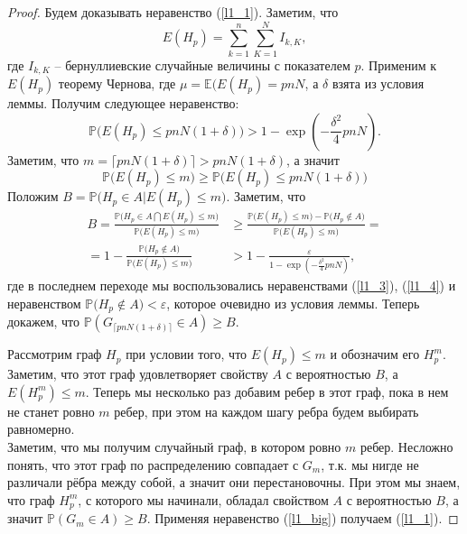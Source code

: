 \documentclass[10pt]{article}
\newcommand{\Expect}{\mathbb E}
\newcommand{\PRob}{\mathbb P}
\newcommand{\leqs}{\leqslant}
\newcommand{\geqs}{\geqslant}
\newcommand{\eps}{\varepsilon}
\theoremstyle{named}
\begin{document}
\begin{proof}
Будем доказывать неравенство (\ref{l1_1}). Заметим, что 
\begin{equation}
E(H_p) = \sum_{k=1}^n \sum_{K=1}^N I_{k, K},
\end{equation}
где $I_{k,K}$ -- бернуллиевские случайные величины с показателем $p$.
Применим к $E(H_p)$ теорему Чернова, где $\mu = \Expect(E(H_p) = pnN$, а $\delta$ взята из условия леммы.
Получим следующее неравенство:
\begin{equation}\label{l1_3}
\PRob\big( E(H_p) \leqs pnN(1+\delta) \big) > 1 - \exp\left(-\frac{\delta^2}{4}pnN\right).
\end{equation}
Заметим, что $m = \lceil pnN(1+\delta) \rceil > pnN(1+\delta)$, а значит
\begin{equation}\label{l1_4}
\PRob\big( E(H_p) \leqs m \big) \geqs \PRob\big( E(H_p) \leqs pnN(1+\delta) \big)
\end{equation}
Положим $B = \PRob\Big( H_p \in A \big| E(H_p) \leqs m \Big)$. Заметим, что
\begin{equation}\label{l1_big}
\begin{aligned}
B = \frac{
		\PRob\Big( H_p \in A \bigcap E(H_p) \leqs m \Big)
	}{
		\PRob\big(E(H_p) \leqs m \big)
	} 
&\geqs 
	\frac{
		\PRob\big(E(H_p) \leqs m \big) 
			-
		\PRob\big(H_p \not\in A \big)
	}{
		\PRob\big(E(H_p) \leqs m\big)
	}
=
\\
=
	1 
		-
	\frac{
		\PRob\big(H_p \not\in A \big)
	}{
		\PRob\big(E(H_p) \leqs m\big)
	}
&>
	1
		-
	\frac{\eps}{
		1 - \exp\left(-\frac{\delta^2}{4}pnN\right)
	},
\end{aligned}\end{equation}
где в последнем переходе мы воспользовались неравенствами (\ref{l1_3}), (\ref{l1_4}) 
и неравенством $\PRob\big(H_p \not\in A \big) < \eps$, которое очевидно из условия леммы.
Теперь докажем, что $\PRob(G_{\lceil pnN(1+\delta) \rceil} \in A) \geqs B$.

Рассмотрим граф $H_p$ при условии того, что $E(H_p) \leqs m$ и обозначим его $H_p^m$. 
Заметим, что этот граф удовлетворяет свойству $A$ с вероятностью $B$, а $E(H_p^m) \leqs m$.
Теперь мы несколько раз добавим ребер в этот граф, пока в нем не станет ровно $m$ ребер, 
при этом на каждом шагу ребра будем выбирать равномерно.
\\
Заметим, что мы получим случайный граф, в котором ровно $m$ ребер. Несложно понять, 
что этот граф по распределению совпадает с $G_m$, т.к. мы нигде не различали рёбра между собой, а значит они перестановочны.
При этом мы знаем, что граф $H_p^m$, с которого мы начинали, обладал свойством $A$ с вероятностью $B$, 
а значит $\PRob(G_m \in A) \geqs B$. Применяя неравенство (\ref{l1_big}) получаем (\ref{l1_1}).


\end{proof}
\end{document}
